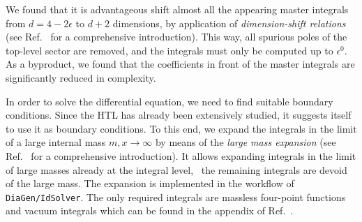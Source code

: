 We found that it is advantageous shift almost all the appearing master integrals from $d = 4 - 2 \epsilon$ to $d + 2$ dimensions, by application of \textit{dimension-shift relations} (see Ref.~\cite{Weinzierl:2022eaz} for a comprehensive introduction). This way, all spurious poles of the top-level sector are removed, and the integrals must only be computed up to $\epsilon^0$. As a byproduct, we found that the coefficients in front of the master integrals are significantly reduced in complexity.

In order to solve the differential equation, we need to find suitable boundary conditions. Since the \acs{HTL} has already been extensively studied, it suggests itself to use it as boundary conditions. To this end, we expand the integrals in the limit of a large internal mass $m, x \rightarrow \infty$ by means of the \textit{large mass expansion} (see Ref.~\cite{Smirnov:2002pj} for a comprehensive introduction). It allows expanding integrals in the limit of large masses already at the integral level, \ie\ the remaining integrals are devoid of the large mass. The expansion is implemented in the workflow of \texttt{DiaGen/IdSolver}. The only required integrals are massless four-point functions and vacuum integrals which can be found in the appendix of Ref.~\cite{Niggetiedt:2023ywb}.

